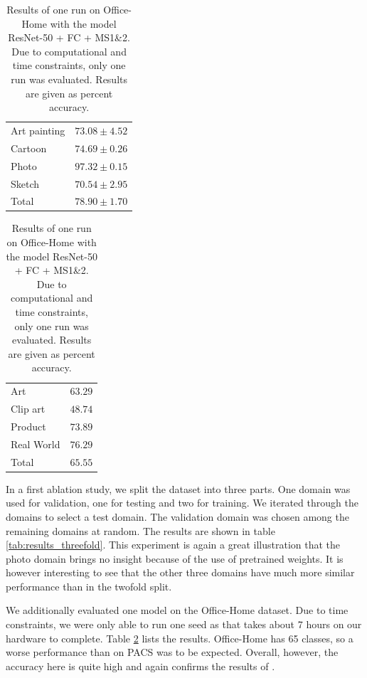 \begin{table}[t]
    \centering
    \begin{minipage}[t]{0.48\textwidth}
        \centering
        \caption{Results of an ablation study on a threefold split of PACS into train, validation and test set. Results are given as mean $\pm$ standard deviation of percent accuracy. The model used was ResNet-50 + FC + MS1\&2 + FR1.}
        \label{tab:results_threefold}
        \vspace{.5em}
        \begin{tabular}{l c}
            \toprule
            Art painting & $73.08 \pm 4.52$ \\
            Cartoon & $74.69 \pm 0.26$ \\
            Photo & $97.32 \pm 0.15$ \\
            Sketch & $70.54 \pm 2.95$ \\
            \midrule
            Total & $78.90 \pm 1.70$ \\
            \bottomrule
        \end{tabular}
    \end{minipage}
    \hfill
    \begin{minipage}[t]{0.48\textwidth}
        \centering
        \caption{Results of one run on Office-Home with the model ResNet-50 + FC + MS1\&2. Due to computational and time constraints, only one run was evaluated. Results are given as percent accuracy.}
        \label{tab:results_office-home}
        \vspace{.5em}
        \begin{tabular}{l c}
            \toprule
            Art & $63.29$ \\
            Clip art & $48.74$ \\
            Product & $73.89$ \\
            Real World & $76.29$ \\
            \midrule
            Total & $65.55$ \\
            \bottomrule
        \end{tabular}
    \end{minipage}
\end{table}

In a first ablation study, we split the dataset into three parts. One domain was used for validation, one for testing and two for training. We iterated through the domains to select a test domain. The validation domain was chosen among the remaining domains at random. The results are shown in table \ref{tab:results_threefold}. This experiment is again a great illustration that the photo domain brings no insight because of the use of pretrained weights. It is however interesting to see that the other three domains have much more similar performance than in the twofold split.

We additionally evaluated one model on the Office-Home dataset. Due to time constraints, we were only able to run one seed as that takes about 7 hours on our hardware to complete. Table \ref{tab:results_office-home} lists the results. Office-Home has 65 classes, so a worse performance than on PACS was to be expected. Overall, however, the accuracy here is quite high and again confirms the results of \cite{mixstyle_ref}.
